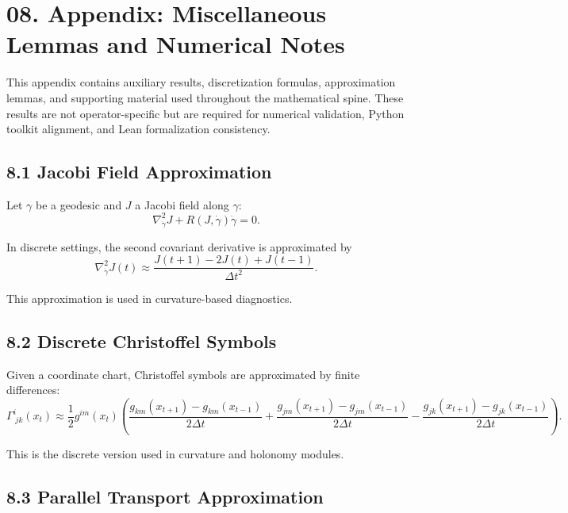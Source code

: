 
\section*{08. Appendix: Miscellaneous Lemmas and Numerical Notes}

This appendix contains auxiliary results, discretization formulas,
approximation lemmas, and supporting material used throughout the
mathematical spine. These results are not operator-specific but are
required for numerical validation, Python toolkit alignment, and Lean
formalization consistency.

\subsection*{8.1 Jacobi Field Approximation}

Let $\gamma$ be a geodesic and $J$ a Jacobi field along $\gamma$:
\[
\nabla_{\dot{\gamma}}^2 J + R(J,\dot{\gamma})\dot{\gamma} = 0.
\]

In discrete settings, the second covariant derivative is approximated by
\[
\nabla_{\dot{\gamma}}^2 J(t)
\approx
\frac{J(t+1) - 2J(t) + J(t-1)}{\Delta t^2}.
\]

This approximation is used in curvature-based diagnostics.

\subsection*{8.2 Discrete Christoffel Symbols}

Given a coordinate chart, Christoffel symbols are approximated by
finite differences:
\[
\Gamma^i_{\;jk}(x_t)
\approx
\frac{1}{2} g^{im}(x_t)
\left(
\frac{g_{km}(x_{t+1}) - g_{km}(x_{t-1})}{2\Delta t}
+
\frac{g_{jm}(x_{t+1}) - g_{jm}(x_{t-1})}{2\Delta t}
-
\frac{g_{jk}(x_{t+1}) - g_{jk}(x_{t-1})}{2\Delta t}
\right).
\]

This is the discrete version used in curvature and holonomy modules.

\subsection*{8.3 Parallel Transport Approximation}

